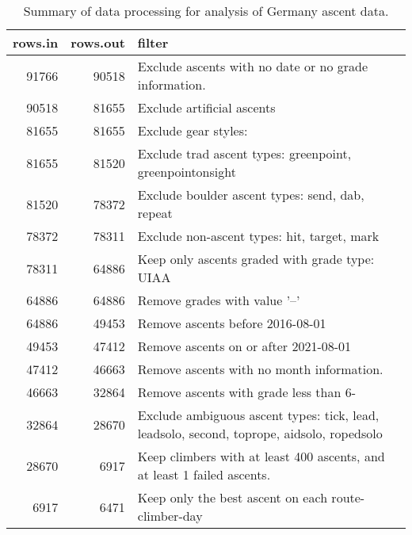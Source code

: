 \begin{table}[ht]
\centering
\begingroup\fontsize{9pt}{10pt}\selectfont
\begin{tabular}{rrl}
  \hline
{\bf rows.in} & {\bf rows.out} & {\bf filter} \\ 
  \hline
91766 & 90518 & Exclude ascents with no date or no grade information. \\ 
  90518 & 81655 & Exclude artificial ascents \\ 
  81655 & 81655 & Exclude gear styles:  \\ 
  81655 & 81520 & Exclude trad ascent types: greenpoint, greenpointonsight \\ 
  81520 & 78372 & Exclude boulder ascent types: send, dab, repeat \\ 
  78372 & 78311 & Exclude non-ascent types: hit, target, mark \\ 
  78311 & 64886 & Keep only ascents graded with grade type: UIAA \\ 
  64886 & 64886 & Remove grades with value '--' \\ 
  64886 & 49453 & Remove ascents before 2016-08-01 \\ 
  49453 & 47412 & Remove ascents on or after 2021-08-01 \\ 
  47412 & 46663 & Remove ascents with no month information. \\ 
  46663 & 32864 & Remove ascents with grade less than 6- \\ 
  32864 & 28670 & Exclude ambiguous ascent types: tick, lead, leadsolo, second, toprope, aidsolo, ropedsolo \\ 
  28670 & 6917 & Keep climbers with at least 400 ascents, and at least 1 failed ascents. \\ 
  6917 & 6471 & Keep only the best ascent on each route-climber-day \\ 
   \hline
\end{tabular}
\endgroup
\caption{Summary of data processing for analysis of Germany ascent data.} 
\label{table-data-processing-germany}
\end{table}
